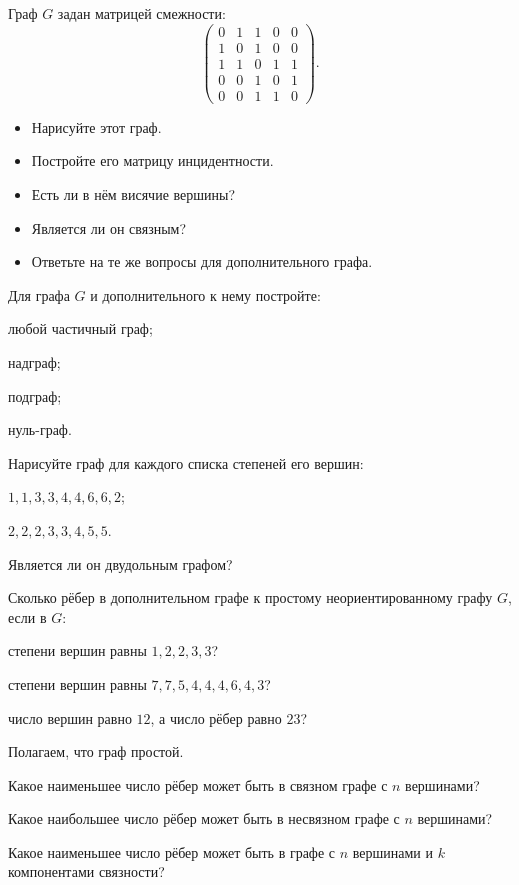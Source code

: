 \documentclass[a4paper,12pt,oneside]{article}
\begin{document}

Граф $G$ задан матрицей смежности:
\[
  \begin{pmatrix}
    0 & 1 & 1 & 0 & 0 \\
    1 & 0 & 1 & 0 & 0 \\
    1 & 1 & 0 & 1 & 1 \\
    0 & 0 & 1 & 0 & 1 \\
    0 & 0 & 1 & 1 & 0
  \end{pmatrix}.
\]
\begin{itemize}
  \item Нарисуйте этот граф.
  \item Постройте его матрицу инцидентности.
  \item Есть ли в нём висячие вершины?
  \item Является ли он связным?
  \item Ответьте на те же вопросы для дополнительного графа.
\end{itemize}

Для графа $G$ и дополнительного к нему постройте:
\begin{alphlist}
  \item любой частичный граф;
  \item надграф;
  \item подграф;
  \item нуль-граф.
\end{alphlist}

Нарисуйте граф для каждого списка степеней его вершин:
\begin{alphlist}
  \item $1,1,3,3,4,4,6,6,2$;
  \item $2,2,2,3,3,4,5,5$.
\end{alphlist}
Является ли он двудольным графом?

Сколько рёбер в дополнительном графе к простому неориентированному графу $G$, если в $G$:
\begin{alphlist}
  \item степени вершин равны $1,2,2,3,3$?
  \item степени вершин равны $7,7,5,4,4,4,6,4,3$?
  \item число вершин равно $12$, а число рёбер равно $23$?
\end{alphlist}

\clearpage

Полагаем, что граф простой.
\begin{alphlist}
  \item Какое наименьшее число рёбер может быть в связном графе с $n$ вершинами?
  \item Какое наибольшее число рёбер может быть в несвязном графе с $n$ вершинами?
  \item Какое наименьшее число рёбер может быть в графе с $n$ вершинами и $k$ компонентами связности?
\end{alphlist}
\end{document}
